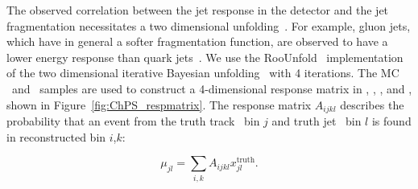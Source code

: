 The observed correlation between the jet response in the detector and the jet fragmentation necessitates a two dimensional unfolding~\cite{PhysRevC.98.024908}.
For example, gluon jets, which have in general a softer fragmentation function, are observed to have a lower energy response than quark jets~\cite{Aad:2014bia}.
We use the RooUnfold~\cite{Adye:2011gm} implementation of the two dimensional iterative Bayesian unfolding~\cite{D'Agostini:1994zf} with 4 iterations.
The MC \pbpb\ and \pp\ samples are used to construct a 4-dimensional response matrix in \pttrktruth, \ptjettruth, \pttrkreco, and \ptjetreco, shown in Figure~\ref{fig:ChPS_respmatrix}.
The response matrix $A_{ijkl}$ describes the probability that an event from the truth track \pt\  bin $j$ and truth jet \pT\ bin $l$ is found in reconstructed bin $i$,$k$:

\begin{equation}
\mu_{jl} = \sum_{i,k} A_{ijkl}x^{\text{truth}}_{jl}.
\end{equation} 


